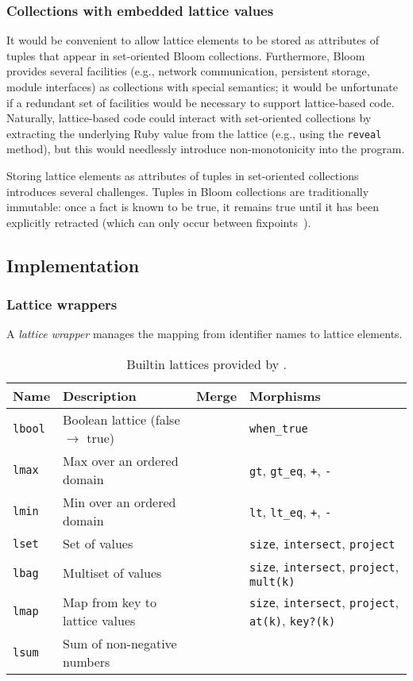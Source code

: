 \subsubsection{Collections with embedded lattice values}
It would be convenient to allow lattice elements to be stored as attributes of
tuples that appear in set-oriented Bloom collections. Furthermore, Bloom
provides several facilities (e.g., network communication, persistent storage,
module interfaces) as collections with special semantics; it would be
unfortunate if a redundant set of facilities would be necessary to support
lattice-based code. Naturally, lattice-based \lang code could interact with
set-oriented collections by extracting the underlying Ruby value from the
lattice (e.g., using the \texttt{reveal} method), but this would needlessly
introduce non-monotonicity into the program.

Storing lattice elements as attributes of tuples in set-oriented collections
introduces several challenges. Tuples in Bloom collections are traditionally
immutable: once a fact is known to be true, it remains true until it has been
explicitly retracted (which can only occur between fixpoints~\cite{dedalus}).

\subsection{Implementation}

\subsubsection{Lattice wrappers}
A \emph{lattice wrapper} manages the mapping from identifier names to lattice
elements.

\begin{table*}[t]
\begin{tabular}{|l|l|l|l|}
\hline
\textbf{Name} & \textbf{Description} & \textbf{Merge} & \textbf{Morphisms} \\
\hline
\texttt{lbool} & Boolean lattice (false $\to$ true) & & \texttt{when\_true} \\
\texttt{lmax} & Max over an ordered domain & &\texttt{gt},
\texttt{gt\_eq}, \texttt{+}, \texttt{-} \\
\texttt{lmin} & Min over an ordered domain & &\texttt{lt}, \texttt{lt\_eq},
\texttt{+}, \texttt{-} \\
\texttt{lset} & Set of values & &\texttt{size}, \texttt{intersect}, \texttt{project}
\\
\texttt{lbag} & Multiset of values & &\texttt{size}, \texttt{intersect},
\texttt{project}, \texttt{mult(k)}\\
\texttt{lmap} & Map from key to lattice values & &\texttt{size},
\texttt{intersect}, \texttt{project}, \texttt{at(k)}, \texttt{key?(k)} \\
\texttt{lsum} & Sum of non-negative numbers & &\\
\hline
\end{tabular}
\caption{Builtin lattices provided by \lang.}
\label{tbl:builtin-lattices}
\end{table*}